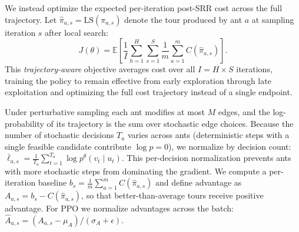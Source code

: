 We instead optimize the expected per-iteration post-SRR cost across the full trajectory.
Let $\hat{\pi}_{a,s} = \mathrm{LS}(\pi_{a,s})$ denote the tour produced by ant $a$ at sampling iteration $s$ after local search:
\begin{equation}
J(\theta) = \mathbb{E} \left[ \frac{1}{I} \sum_{h=1}^H \sum_{s=1}^S \frac{1}{m} \sum_{a=1}^m C(\hat{\pi}_{a,s}) \right].
\end{equation}
This \emph{trajectory-aware} objective averages cost over all $I = H \times S$ iterations, training the policy to remain effective from early exploration through late exploitation and optimizing the full cost trajectory instead of a single endpoint.

Under perturbative sampling each ant modifies at most $M$ edges, and the log-probability of its trajectory is the sum over stochastic edge choices.
Because the number of stochastic decisions $T_a$ varies across ants (deterministic steps with a single feasible candidate contribute $\log p = 0$), we normalize by decision count: $\bar{\ell}_{a,s} = \frac{1}{T_a} \sum_{t=1}^{T_a} \log p^\theta(v_t \mid u_t)$.
This per-decision normalization prevents ants with more stochastic steps from dominating the gradient.
We compute a per-iteration baseline $b_s = \frac{1}{m}\sum_{a=1}^{m} C(\hat{\pi}_{a,s})$ and define advantage as $A_{a,s} = b_s - C(\hat{\pi}_{a,s})$, so that better-than-average tours receive positive advantage.
For PPO we normalize advantages across the batch: $\hat{A}_{a,s} = (A_{a,s} - \mu_A) / (\sigma_A + \epsilon)$.

